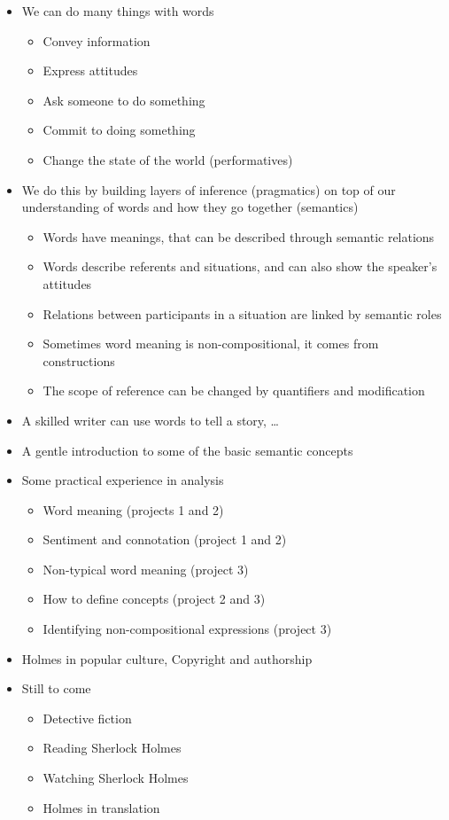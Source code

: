 \documentclass[a4paper,landscape,headrule,footrule,xetex]{foils}
\begin{document}
\begin{itemize}
\item We can do many things with words
  \begin{itemize}
  \item Convey information
  \item Express attitudes
  \item Ask someone to do something
  \item Commit to doing something
  \item Change the state of the world (performatives)
  \end{itemize}
\newpage
\item We do this by building layers of inference (pragmatics) on top
  of our understanding of words and how they go together (semantics)
  \begin{itemize}
  \item Words have meanings, that can be described through semantic relations
  \item Words describe referents and situations, and can also show the
    speaker's attitudes
  \item Relations between participants in a situation are linked by semantic roles
  \item Sometimes word meaning is non-compositional, it comes from constructions
  \item The scope of reference can be changed by quantifiers and modification
  \end{itemize}
\item A skilled writer can use words to tell a story, \ldots
\end{itemize}


\begin{itemize}
\item A gentle introduction to some of the basic semantic concepts
\item Some practical experience in analysis
  \begin{itemize}
  \item Word meaning (projects 1 and 2)
  \item Sentiment and connotation (project 1 and 2)
  \item Non-typical word meaning (project 3)
  \item How to define concepts (project 2 and 3)
  \item Identifying non-compositional expressions (project 3)
  \end{itemize}
\item Holmes in popular culture,  Copyright and authorship
\item Still to come
  \begin{itemize}
  \item Detective fiction 
  \item Reading Sherlock Holmes
  \item Watching Sherlock Holmes
  \item Holmes in translation
  \end{itemize}
\end{itemize}
\end{document}
